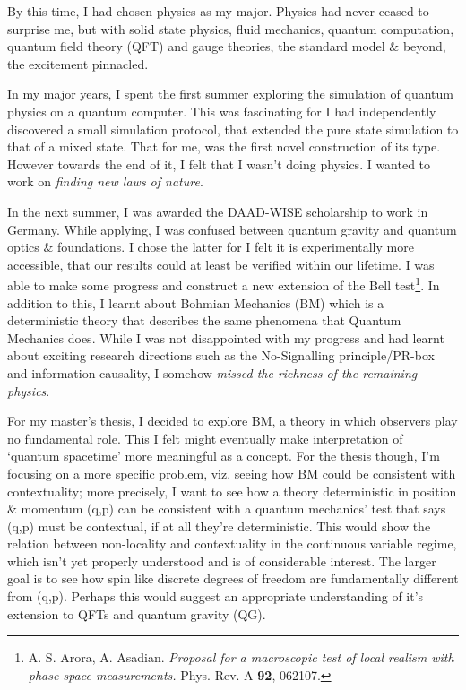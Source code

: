By this time, I had chosen physics as my major. Physics had never ceased to surprise me, but with solid state physics, fluid mechanics, quantum computation, quantum field theory (QFT) and gauge theories, the standard model \& beyond, the excitement pinnacled. 


In my major years, I spent the first summer exploring the simulation of quantum physics  on a quantum computer. This was fascinating for I had independently discovered a small simulation protocol, that extended the pure state simulation to that of a mixed state. That for me, was the first novel construction of its type. However towards the end of it, I felt that I wasn't doing physics. I wanted to work on \emph{finding new laws of nature}.


In the next summer, I was awarded the DAAD-WISE scholarship to work in Germany. While applying, I was confused between quantum gravity and quantum optics \& foundations. I chose the latter for I felt it is experimentally more accessible, that our results could at least be verified within our lifetime. I was able to make some progress and construct a new extension of the Bell test\footnote{A. S. Arora, A. Asadian. \emph{Proposal for a macroscopic test of local realism with phase-space measurements.} Phys. Rev. A \textbf{92}, 062107.}. 
In addition to this, I learnt about Bohmian Mechanics (BM) which is a deterministic theory that describes the same phenomena that Quantum Mechanics does. While I was not disappointed with my progress and had learnt about exciting research directions such as the No-Signalling principle/PR-box and information causality, I somehow \emph{missed the richness of the remaining physics}.


For my master's thesis, I decided to explore BM, a theory in which observers play no fundamental role. This I felt might eventually make interpretation of `quantum spacetime' more meaningful as a concept. For the thesis though, I'm focusing on a more specific problem, viz. seeing how BM could be consistent with contextuality; more precisely, I want to see how a theory deterministic in position \& momentum (q,p) can be consistent with a quantum mechanics' test that says (q,p) must be contextual, if at all they're deterministic. This would show the relation between non-locality and contextuality in the continuous variable regime, which isn't yet properly understood and is of considerable interest. The larger goal is to see how spin like discrete degrees of freedom are fundamentally different from (q,p). Perhaps this would suggest an appropriate understanding of it's extension to QFTs and quantum gravity (QG).


